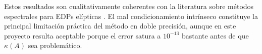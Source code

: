\documentclass[11pt,a4paper,twoside,pdf]{article}
\numberwithin{equation}{section}
\begin{document}
Estos resultados son cualitativamente coherentes con la literatura
sobre métodos espectrales para EDPs elípticas
\cite{boyd2001chebyshev,trefethen2000spectral,canuto2006spectral}. El
mal condicionamiento intrínseco constituye la principal limitación
práctica del método en doble precisión, aunque en este proyecto
resulta aceptable porque el error satura a $10^{-13}$ bastante antes
de que $\kappa(A)$ sea problemático.

\newpage


\end{document}
